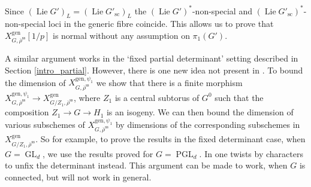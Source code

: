 \documentclass{amsart}
\theoremstyle{definition}
\theoremstyle{remark}
\DeclareMathOperator{\GL}{GL}
\newcommand{\rhobar}{\overline{\rho}}
\newcommand{\gen}{\mathrm{gen}}
\DeclareMathOperator{\PGL}{PGL}
\DeclareMathOperator{\Lie}{Lie}
\newcommand{\rhobarss}{\rhobar^{\mathrm{ss}}}
\newcommand{\sic}{\operatorname{sc}}
\begin{document}
Since $(\Lie G')_L= (\Lie G'_{\sic})_L$ the $(\Lie G')^{\ast}$-non-special and $(\Lie G'_{\sic})^{\ast}$-non-special loci in the generic
fibre coincide. This allows us to prove that $X^{\gen}_{G, \rhobarss}[1/p]$ is normal without any assumption on $\pi_1(G')$. 

A similar argument works in the `fixed partial determinant' setting described in Section \ref{intro_partial}. However, there 
is one new idea not present in \cite{BIP_new}. To bound the dimension of $X^{\gen, \psi_1}_{G, \rhobarss}$ we show that there
is a finite morphism $X^{\gen, \psi_1}_{G, \rhobarss}\rightarrow X^{\gen}_{G/Z_1, \rhobarss}$, where 
$Z_1$ is a central subtorus of $G^0$ such that the composition $Z_1\rightarrow G \rightarrow H_1$ is an isogeny. We 
can then bound the dimension of various subschemes of $X^{\gen, \psi_1}_{G, \rhobarss}$ by dimensions 
of the corresponding subschemes in $X^{\gen}_{G/Z_1, \rhobarss}$. So for example, to prove the results 
in the fixed determinant case, when $G=\GL_d$, we use the results proved for $G=\PGL_d$. In \cite{BIP_new} 
one twists by characters to unfix the determinant instead. This argument can be made to work, when $G$ is connected, but 
will not work in general. 
\end{document}
